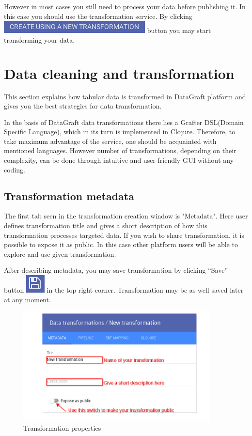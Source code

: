 \documentclass[USenglish]{article}
\begin{document}
However in most cases you still need to process your data before publishing it. In this case you should use the transformation service. By clicking {\includegraphics[scale=0.8]{createusingnewtransformation.png}} button you may start transforming your data. 

\section{Data cleaning and transformation \label{transform}}
This section explains how tabular data is transformed in DataGraft platform and gives you the best strategies for data transformation.

In the basis of DataGraft data transformations there lies a Grafter DSL(Domain Specific Language), which in its turn is implemented in Clojure. Therefore, to take maximum advantage of the service, one should be acquainted with mentioned languages. However number of transformations, depending on their complexity, can be done through intuitive and user-friendly GUI without any coding.



\subsection{Transformation metadata}
The first tab seen in the transformation creation window is "Metadata". Here user defines transformation title and gives a short description of how this transformation processes targeted data. If you wish to share transformation, it is possible to expose it as public. In this case other platform users will be able to explore and use given transformation.


After describing metadata, you may save transformation by clicking “Save” button {\includegraphics[scale=0.8]{save.png}} in the top right corner. Transformation may be as well saved later at any moment.


\begin{center}
\begin{figure}[!htbp]
\centering
\includegraphics[height=6cm] {transformationmeta.png}
 \caption{Transformation properties \label{meta}}
\end{figure}
\end{center}
\end{document}
